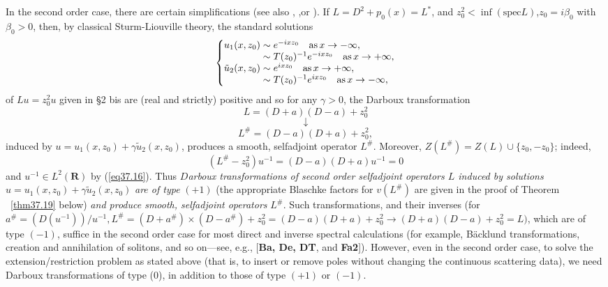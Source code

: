 \documentclass{surv-l}
\theoremstyle{plain}
\theoremstyle{definition}
\numberwithin{equation}{chapter}
\begin{document}
In the second order case, there are certain simplifications (see also \cite{De}, \cite{DT},or \cite{Fa2}). If $L=D^{2}+p_{0}(x)=L^{*}$, and $z_{0}^{2}<\displaystyle \inf(\mathrm{spec} L)$,$ z_{0}=i\beta_{0}$ with $\beta_{0}>0$, then, by classical Sturm-Liouville theory, the standard solutions
\begin{align}\label{eq37.16}
\left\{
\begin{array}{@{}l@{}}
u_{1}(x, z_{0})\sim e^{-ixz_{0}}\quad \mathrm{as}\, x\rightarrow -\infty,\\
\qquad\qquad\sim T(z_{0})^{-1}e^{-ixz_{0}}\quad \mathrm{as}\, x\rightarrow +\infty,\\
\tilde{u}_{2}(x,z_{0})\sim e^{ixz_{0}}\quad \mathrm{as}\, x\rightarrow +\infty,\\
\qquad\qquad\sim T(z_{0})^{-1}e^{ixz_{0}}\quad \mathrm{as}\, x\rightarrow -\infty,
\end{array}\right.
\end{align}
of $Lu=z_{0}^{2}u$ given in \S 2 bis are (real and strictly) positive and so for any $\gamma>0$, the Darboux transformation
\begin{equation*}
L=(D+a)(D-a)+z_{0}^{2}
\end{equation*}
\begin{equation*}
\downarrow
\end{equation*}
\begin{equation*}
L^{\#}=(D-a)(D+a)+z_{0}^{2},
\end{equation*}
induced by $u=u_{1}(x,z_{0})+\gamma\tilde{u}_{2}(x,z_{0})$, produces a smooth, selfadjoint operator $L^{\#}$. Moreover, $Z(L^{\#})=Z(L)\cup\{z_{0},-z_{0}\}$; indeed,
\begin{equation*}
(L^{\#}-z_{0}^{2})u^{-1}=(D-a)(D+a)u^{-1}=0
\end{equation*}
and $u^{-1}\in L^{2}(\mathbf{R})$ by (\ref{eq37.16}). Thus $D$\emph{arboux transformations of second order selfadjoint operators $L$ induced by solutions} $u=u_{1}(x,z_{0})+\gamma\tilde{u}_{2}(x,z_{0})$ \emph{are of type} $(+1)$ (the appropriate Blaschke factors for $v(L^{\#})$ are given in the proof of Theorem ~\ref{thm37.19} below) \emph{and produce smooth, selfadjoint operators} $L^{\#}$. Such transformations, and their inverses (for $a^{\#}=(D(u^{-1}))/u^{-1},L^{\#}=(D+a^{\#}) \times(D-a^{\#})+z_{0}^{2}=(D-a)(D+a)+z_{0}^{2}\rightarrow(D+a)(D-a)+z_{0}^{2}=L)$, which are of type $(-1)$, suffice in the second order case for most direct and inverse spectral calculations (for example, B\"{a}cklund transformations, creation and annihilation of solitons, and so on---see, e.g., [\textbf{Ba, De, DT}, and \textbf{Fa2}]). However, even in the second order case, to solve the extension/restriction problem as stated above (that is, to insert or remove poles without changing the continuous scattering data), we need Darboux transformations of type (0), in addition to those of type $(+1)$ or $(-1)$.
\end{document}
